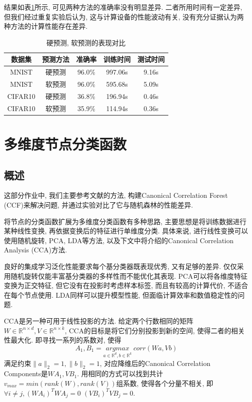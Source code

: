 \documentclass[a4paper]{article}
\begin{document}
结果如表\ref{table_rf_pred}所示, 可见两种方法的准确率没有明显差异. 二者所用时间有一定差异, 但我们经过重复实验后认为, 这与计算设备的性能波动有关, 没有充分证据认为两种方法的计算性能存在差异.


\begin{table}[ht]
\centering
\caption{硬预测, 软预测的表现对比}
\begin{tabular}{|c|c|c|c|c|}
\hline
数据集& 预测方法 &准确率&训练时间&测试时间\\
\hline
MNIST & 硬预测&96.0\%  &997.06s & 9.16s\\
MNIST & 软预测 &96.0\%  &595.68s & 5.09s\\
CIFAR10& 硬预测 & 36.8\% &196.94s & 0.46s\\
CIFAR10& 软预测 & 35.9\% &114.94s & 0.36s\\
\hline
\end{tabular}
\label{table_rf_pred}
\end{table}


\section{多维度节点分类函数}


\subsection{概述}
这部分作业中, 我们主要参考文献\cite{ccf}的方法, 构建Canonical Correlation Forest (CCF)来解决问题, 并通过实验对比了它与随机森林的性能差异.

将节点的分类函数扩展为多维度分类函数有多种思路, 主要思想是将训练数据进行某种线性变换, 再依据变换后的特征进行单维度分类. 具体来说, 进行线性变换可以使用随机旋转, PCA, LDA等方法, 以及下文中将介绍的Canonical Correlation Analysis (CCA)方法.

良好的集成学习泛化性能要求每个基分类器既表现优秀, 又有足够的差异. 仅仅采用随机旋转仅能丰富基分类器的多样性而不能优化其表现. PCA可以将各维度特征变换为正交特征, 但它没有在投影时考虑样本标签, 而且有较高的计算代价, 不适合在每个节点使用. LDA同样可以提升模型性能, 但面临计算效率和数值稳定性的问题. 

CCA\cite{cca}是另一种可用于线性投影的方法. 给定两个行数相同的矩阵$W\in\mathbb {R}^{n\times d}, V\in\mathbb {R}^{n\times k}$, CCA的目标是将它们分别投影到新的空间, 使得二者的相关性最大化. 即寻找一系列的系数对, 使得
$$ {A_1,B_1}= \underset{a\in \mathbb{R}^d,b\in \mathbb{R}^k}{argmax}\   corr(Wa,Vb)$$
满足约束$\| a\|_2=1,\|b\|_2=1$, 对应降维后的Canonical Correlation Components是$WA_1,VB_1$. 用相同的方式可以找到共计$v_{max}=min(rank(W),rank(V))$组系数, 使得各个分量不相关, 即 $\forall i\neq j, (WA_i)^T WA_j=0$  $(VB_i)^T VB_j=0$.
\end{document}
